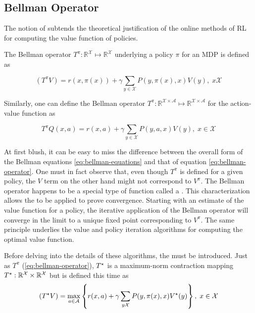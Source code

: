 \subsection{Bellman Operator}
The notion of  subtends the theoretical justification of the online methods of RL for computing the value function of policies. 

\begin{defn}
The Bellman operator $T^\pi: \mathbb{R}^\mathcal{X} \mapsto \mathbb{R}^\mathcal{X}$ underlying a policy $\pi$ for an MDP is defined as

\begin{equation}
(T^\pi V) = r(x, \pi(x)) + \gamma \sum_{y \in \mathcal{X}} P(y, \pi(x), x) V(y), \; x
\mathcal{X} \label{eq:bellman-operator}
\end{equation}
\end{defn}

Similarly, one can define the Bellman operator $T^\pi : \mathbb{R}^{\mathcal{X}
\times \mathcal{A}} \mapsto \mathbb{R}^{\mathcal{X} \times \mathcal{A}}$ for the
action-value function as

\begin{equation}
T^\pi Q(x, a) = r(x, a) + \gamma \sum_{y \in \mathcal{X}} P(y, a, x) V(y), \; x \in
\mathcal{X} \label{eq:bellman-operator-action-value}
\end{equation}

At first blush, it can be easy to miss the difference between the overall form of the
Bellman equations \ref{eq:bellman-equations} and that of equation \ref{eq:bellman-operator}. One must in fact observe that, even though $T^\pi$ is defined for a given
policy, the $V$ term on the other hand might not correspond to $V^\pi$. 
The Bellman operator happens to be a special type of function called a
. This characterization allows the  to be applied to prove convergence.  Starting with an
estimate of the value function for a policy, the iterative application of the Bellman
operator will converge in the limit to a unique fixed point corresponding to $V^\pi$. The same principle underlies the value and policy iteration algorithms for computing the optimal value function. 

Before delving into the details of these
algorithms, the  must be introduced. Just as
$T^\pi$ (\ref{eq:bellman-operator}), $T^\star$ is a maximum-norm contraction
mapping $T^\star: \mathbb{R}^\mathcal{X} \times \mathbb{R}^\mathcal{X}$ but 
is defined this time as
\begin{equation}
(T^\star V) = \max_{a \in \mathcal{A}} \left\lbrace r(x, a) + \gamma \sum_{y
\mathcal{X}} P(y, \pi(x), x) V^\star (y) \right\rbrace, \; x \in \mathcal{X} 
\label{eq:bellman-optimality-operator}
\end{equation}

